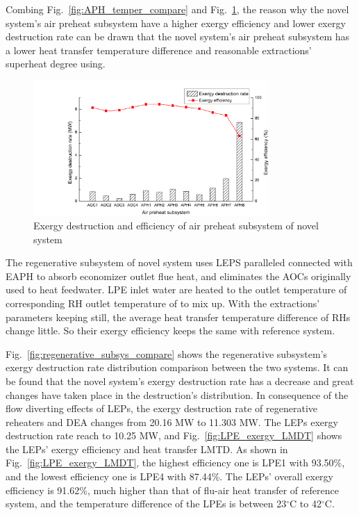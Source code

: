 \documentclass[preprint,12pt]{elsarticle}
\begin{document}
Combing Fig.~\ref{fig:APH_temper_compare}  and Fig.~\ref{fig:novel_APH_exergy}, the reason why the novel system's air preheat subsystem have a higher exergy efficiency and lower exergy destruction rate can be drawn that the novel system's air preheat subsystem has a lower heat transfer temperature difference and reasonable extractions' superheat degree using.


\begin{figure}[htbp]
\centering
\includegraphics[width=0.8\textwidth]{fig/novel_APH_exergy.png}
\caption{Exergy destruction and efficiency of air preheat subsystem of novel system} %
\label{fig:novel_APH_exergy}
\end{figure}

The regenerative subsystem of novel system uses LEPS paralleled connected with EAPH to absorb economizer outlet flue heat, and eliminates the AOCs originally used to heat feedwater.
LPE inlet water are heated to the outlet temperature of corresponding RH outlet temperature of to mix up.
With the extractions' parameters keeping still, the average heat transfer temperature difference of RHs change little.
So their exergy efficiency keeps the same with reference system.

Fig.~\ref{fig:regenerative_subsys_compare} shows the regenerative subsystem's exergy destruction rate distribution comparison between the two systems.
It can be found that the novel system's exergy destruction rate has a decrease and great changes have taken place in the destruction's distribution.
In consequence of the flow diverting effects of LEPs, the exergy destruction rate of regenerative reheaters and DEA changes from 20.16 MW to 11.303 MW.
The LEPs exergy destruction rate reach to 10.25 MW, and Fig.~\ref{fig:LPE_exergy_LMDT} shows the LEPs' exergy efficiency and heat transfer LMTD.
As shown in Fig.~\ref{fig:LPE_exergy_LMDT}, the highest efficiency one is LPE1 with 93.50\%, and the lowest efficiency one is LPE4 with 87.44\%. 
The LEPs' overall exergy efficiency is 91.62\%, much higher than that of flu-air heat transfer of reference system, and the temperature difference of the LPEs is between 23$^\circ$C to 42$^\circ$C.
\end{document}
